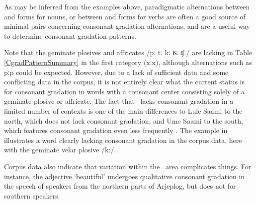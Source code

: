 As may be inferred from the examples above, paradigmatic alternations between \mbox{} and \mbox{} forms for nouns, or between  and  forms for verbs are often a good source of minimal pairs concerning consonant gradation alternations, and are a useful way to determine consonant gradation patterns. 

Note that the geminate plosives and affricates /pː tː kː ʦː ʧː/ are lacking in Table \vref{CgradPatternSummary} in the first category (xː\Div x), although alternations such as pː\Div p could be expected. However, due to a lack of sufficient data and some conflicting data in the corpus, it is not entirely clear what the current status is for consonant gradation in words with a consonant center consisting solely of a geminate plosive or affricate. The fact that \PS\ lacks consonant gradation in a limited number of contexts is one of the main differences to Lule Saami to the north, which does not lack consonant gradation, and Ume Saami to the south, which features consonant gradation even less frequently \citep[cf.][21-23]{Sammallahti1998}. 
The example in  illustrates a word clearly lacking consonant gradation in the corpus data, here with the geminate velar plosive /kː/. 
\ea\label{CgradEx4a}%
\z

Corpus data also indicate that variation within the \PS\ area complicates things. For instance, the adjective  ‘beautiful’ undergoes qualitative consonant gradation in the speech of speakers from the northern parts of Arjeplog, but does not for southern speakers. 
\ea\label{CgradEx4b}%
\z

